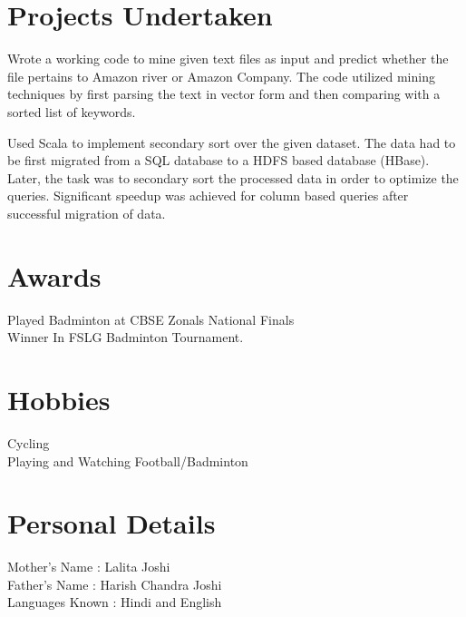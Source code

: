 \documentclass[letterpaper]{deedy-resume-openfont}
\begin{document}
\begin{minipage}[t]{0.66\textwidth}

\section{Projects Undertaken}
Wrote a working code to mine given text files as input and predict whether the file pertains to Amazon river or Amazon Company. The code utilized mining techniques by first parsing the text in vector form and then comparing with a sorted list of keywords.
\sectionsep

Used Scala to implement secondary sort over the given dataset. The data had to be first migrated from a SQL database to a HDFS based database (HBase). Later, the task was to secondary sort the processed data in order to optimize the queries. Significant speedup was achieved for column based queries after successful migration of data.
\sectionsep


\section{Awards} 
Played Badminton at CBSE Zonals National Finals \\
Winner In FSLG Badminton Tournament.

\sectionsep


\section{Hobbies} 

Cycling \\
Playing and Watching Football/Badminton
\sectionsep


\section{Personal Details} 

Mother’s Name	:	Lalita Joshi \\
Father’s Name 	:	Harish Chandra Joshi \\
Languages Known	:	Hindi and English


\end{minipage} 
\end{document}
